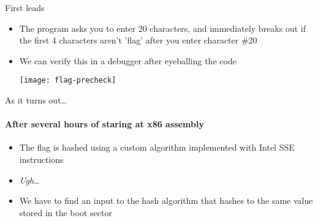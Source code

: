 \begin{frame}{First leads}
    \begin{itemize}
        \item<1-> The program asks you to enter 20 characters, and immediately
                  breaks out if the first 4 characters aren't 'flag' after you
                  enter character \#20
        \item<2-> We can verify this in a debugger after eyeballing the code

        \begin{center}
             {\texttt{[image: flag-precheck]}}
        \end{center}
    \end{itemize}
\end{frame}

\begin{frame}{As it turns out\ldots}
    \framesubtitle{After several hours of staring at x86 assembly}

    \begin{itemize}
        \item<1-> The flag is \alert{hashed} using a \alert{custom algorithm}
                  implemented with Intel SSE instructions
        \item<2-> {\em Ugh\ldots}
        \item<3-> We have to find an input to the hash algorithm that hashes
                  to the same value stored in the boot sector
    \end{itemize}
\end{frame}

